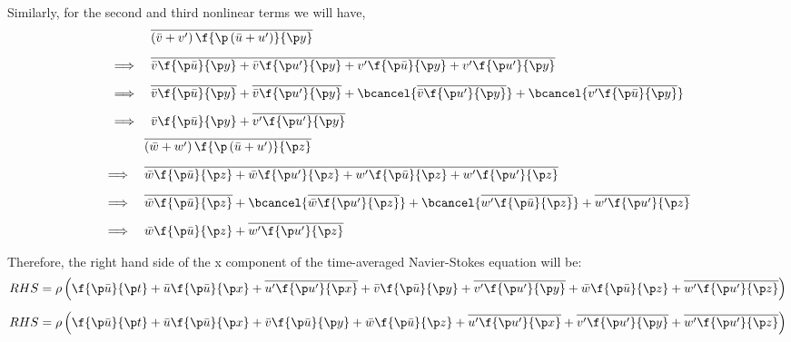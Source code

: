 Similarly, for the second and third nonlinear terms we will have,
%
\begin{equation}
  \begin{aligned}
    &\overline{\left(\bar{v} + v^\prime\right) \f{\p \left(\bar{u} + u^\prime\right)}{\p y}} \\[5pt]
    \implies\quad
    &\overline{
      \bar{v} \f{\p \bar{u}}{\p y} + \bar{v} \f{\p u^\prime}{\p y}
      + v^\prime \f{\p \bar{u}}{\p y} + v^\prime \f{\p u^\prime}{\p y}
    } \\[5pt]
    \implies\quad
    &\overline{\bar{v} \f{\p \bar{u}}{\p y}}
    + \overline{\bar{v} \f{\p u^\prime}{\p y}}
    + \bcancel{\overline{\bar{v} \f{\p u^\prime}{\p y}}}
    + \bcancel{\overline{v^\prime \f{\p \bar{u}}{\p y}}} \\[5pt]
    \implies\quad
    &\bar{v} \f{\p \bar{u}}{\p y} + \overline{v^\prime \f{\p u^\prime}{\p y}}
  \end{aligned}
  \label{eq:NS-time-averaged-rhs-nonlinear-first-term-v}
\end{equation}
%
\begin{equation}
  \begin{aligned}
    &\overline{\left(\bar{w} + w^\prime\right) \f{\p \left(\bar{u} + u^\prime\right)}{\p z}} \\[5pt]
    \implies\quad
    &\overline{
      \bar{w} \f{\p \bar{u}}{\p z} + \bar{w} \f{\p u^\prime}{\p z}
      + w^\prime \f{\p \bar{u}}{\p z} + w^\prime \f{\p u^\prime}{\p z}
    } \\[5pt]
    \implies\quad
    &\overline{\bar{w} \f{\p \bar{u}}{\p z}}
    + \bcancel{\overline{\bar{w} \f{\p u^\prime}{\p z}}}
    + \bcancel{\overline{w^\prime \f{\p \bar{u}}{\p z}}}
    + \overline{w^\prime \f{\p u^\prime}{\p z}} \\[5pt]
    \implies\quad
    &\bar{w} \f{\p \bar{u}}{\p z} + \overline{w^\prime \f{\p u^\prime}{\p z}}
  \end{aligned}
  \label{eq:NS-time-averaged-rhs-nonlinear-first-term-w}
\end{equation}


Therefore, the right hand side of the x component of the time-averaged Navier-Stokes equation will be:
%
\begin{equation}
  \begin{aligned}
    RHS &= \rho \left(
      \f{\p \bar{u}}{\p t}
      + \bar{u} \f{\p \bar{u}}{\p x} + \overline{u^\prime \f{\p u^\prime}{\p x}}
      + \bar{v} \f{\p \bar{u}}{\p y} + \overline{v^\prime \f{\p u^\prime}{\p y}}
      + \bar{w} \f{\p \bar{u}}{\p z} + \overline{w^\prime \f{\p u^\prime}{\p z}}
    \right) \\[5pt]
      RHS &= \rho \left(
        \f{\p \bar{u}}{\p t}
        + \bar{u} \f{\p \bar{u}}{\p x}
        + \bar{v} \f{\p \bar{u}}{\p y}
        + \bar{w} \f{\p \bar{u}}{\p z}
        + \overline{u^\prime \f{\p u^\prime}{\p x}}
        + \overline{v^\prime \f{\p u^\prime}{\p y}}
        + \overline{w^\prime \f{\p u^\prime}{\p z}}
      \right)
  \end{aligned}
  \label{eq:NS-time-averaged-rhs-combined}
\end{equation}

